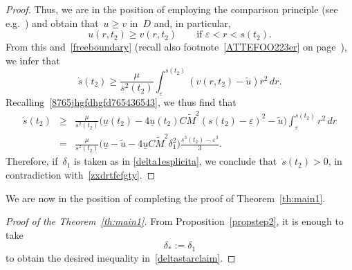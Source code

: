 \documentclass[12pt,a4paper,intlimits,sumlimits]{amsart}
\theoremstyle{definition}
\theoremstyle{plain}
\numberwithin{equation}{section}
\renewcommand{\geq}{\geqslant}
\renewcommand{\ge}{\geqslant}
\begin{document}
\begin{proof}
Thus, we are in the position of employing the comparison principle (see e.g.~\cite[Corollary~2.5]{MR1465184}) and obtain that~$u\geq v$ in~$D$ and, in particular,
\begin{equation*}
u(r,t_2)\geq v(r,t_2) \qquad \mbox{if }\varepsilon<r<s(t_2).
\end{equation*}
From this and~\eqref{freeboundary} (recall also footnote~\ref{ATTEFOO223er} on page~\pageref{ATTEFOO223er}), we infer that
$$ \dot s(t_2)\geq \frac{\mu}{s^2(t_2)}\int_\varepsilon^{s(t_2)}(v(r,t_2)-\widetilde u)r^2\,dr.$$
Recalling~\eqref{8765jhgfdhgfd765436543}, we thus find that
\begin{eqnarray*} \dot s(t_2)&\ge&\frac{\mu}{s^2(t_2)} \big(\underline{u}(t_2)-4\underline{u}(t_2)C\widetilde M^2(s(t_2)-\varepsilon)^2-\widetilde u\big)\int_\varepsilon^{s(t_2)}r^2\,dr
\\&=&\frac{\mu}{s^2(t_2)} \big(\underline u-\widetilde u-4\underline u C\widetilde M^2\delta_1^2\big)\frac{s^3(t_2)-\varepsilon^3}3
.\end{eqnarray*}
Therefore, if~$\delta_1$ is taken as in \eqref{delta1esplicita}, we conclude that~$\dot s(t_2)>0$, in contradiction with~\eqref{zxdrtfcfgty}.
\end{proof}

We are now in the position of completing the proof of Theorem~\ref{th:main1}.

\begin{proof}[Proof of the Theorem~\ref{th:main1}]
From Proposition~\ref{propstep2}, it is enough to take
\begin{equation}\label{deltastar}
\delta_*:=\delta_1
\end{equation}
to obtain the desired inequality in~\eqref{deltastarclaim}.
\end{proof}
\end{document}
